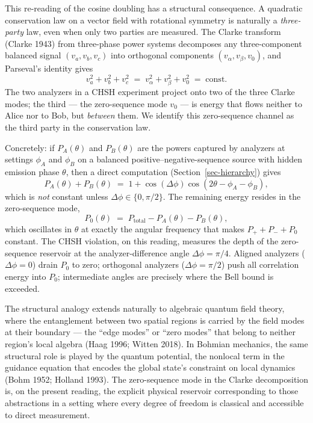 \documentclass[
  11pt]{article}
\begin{document}
This re-reading of the cosine doubling has a structural consequence. A
quadratic conservation law on a vector field with rotational symmetry is
naturally a \emph{three-party} law, even when only two parties are
measured. The Clarke transform (Clarke 1943) from three-phase power
systems decomposes any three-component balanced signal
\((v_a, v_b, v_c)\) into orthogonal components
\((v_\alpha, v_\beta, v_0)\), and Parseval's identity gives \[
v_a^2 + v_b^2 + v_c^2 \;=\; v_\alpha^2 + v_\beta^2 + v_0^2 \;=\; \mathrm{const}.
\] The two analyzers in a CHSH experiment project onto two of the three
Clarke modes; the third --- the zero-sequence mode \(v_0\) --- is energy
that flows neither to Alice nor to Bob, but \emph{between} them. We
identify this zero-sequence channel as the third party in the
conservation law.

Concretely: if \(P_A(\theta)\) and \(P_B(\theta)\) are the powers
captured by analyzers at settings \(\phi_A\) and \(\phi_B\) on a
balanced positive--negative-sequence source with hidden emission phase
\(\theta\), then a direct computation (Section~\ref{sec-hierarchy})
gives \[
P_A(\theta) + P_B(\theta) \;=\; 1 + \cos(\Delta\phi)\cos(2\theta - \phi_A - \phi_B),
\] which is \emph{not} constant unless \(\Delta\phi \in \{0, \pi/2\}\).
The remaining energy resides in the zero-sequence mode, \[
P_0(\theta) \;=\; P_\text{total} - P_A(\theta) - P_B(\theta),
\] which oscillates in \(\theta\) at exactly the angular frequency that
makes \(P_+ + P_- + P_0\) constant. The CHSH violation, on this reading,
measures the depth of the zero-sequence reservoir at the
analyzer-difference angle \(\Delta\phi = \pi/4\). Aligned analyzers
(\(\Delta\phi = 0\)) drain \(P_0\) to zero; orthogonal analyzers
(\(\Delta\phi = \pi/2\)) push all correlation energy into \(P_0\);
intermediate angles are precisely where the Bell bound is exceeded.

The structural analogy extends naturally to algebraic quantum field
theory, where the entanglement between two spatial regions is carried by
the field modes at their boundary --- the ``edge modes'' or ``zero
modes'' that belong to neither region's local algebra (Haag 1996; Witten
2018). In Bohmian mechanics, the same structural role is played by the
quantum potential, the nonlocal term in the guidance equation that
encodes the global state's constraint on local dynamics (Bohm 1952;
Holland 1993). The zero-sequence mode in the Clarke decomposition is, on
the present reading, the explicit physical reservoir corresponding to
those abstractions in a setting where every degree of freedom is
classical and accessible to direct measurement.
\end{document}
